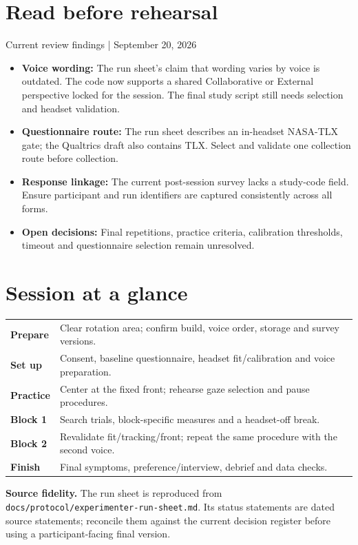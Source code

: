 \documentclass[11pt]{article}
\begin{document}
\section{Read before rehearsal}
\begin{ucfcallout}{Current review findings | September 20, 2026}
\begin{itemize}
\item \textbf{Voice wording:} The run sheet's claim that wording varies by voice is outdated. The code now supports a shared Collaborative or External perspective locked for the session. The final study script still needs selection and headset validation.
\item \textbf{Questionnaire route:} The run sheet describes an in-headset NASA-TLX gate; the Qualtrics draft also contains TLX. Select and validate one collection route before collection.
\item \textbf{Response linkage:} The current post-session survey lacks a study-code field. Ensure participant and run identifiers are captured consistently across all forms.
\item \textbf{Open decisions:} Final repetitions, practice criteria, calibration thresholds, timeout and questionnaire selection remain unresolved.
\end{itemize}
\end{ucfcallout}
\section{Session at a glance}
\begin{tabularx}{\linewidth}{@{}p{0.8in}X@{}}
\textbf{Prepare} & Clear rotation area; confirm build, voice order, storage and survey versions. \\[10pt]
\textbf{Set up} & Consent, baseline questionnaire, headset fit/calibration and voice preparation. \\[10pt]
\textbf{Practice} & Center at the fixed front; rehearse gaze selection and pause procedures. \\[10pt]
\textbf{Block 1} & Search trials, block-specific measures and a headset-off break. \\[10pt]
\textbf{Block 2} & Revalidate fit/tracking/front; repeat the same procedure with the second voice. \\[10pt]
\textbf{Finish} & Final symptoms, preference/interview, debrief and data checks. \\
\end{tabularx}
\vspace{12pt}
\textbf{Source fidelity.} The run sheet is reproduced from \texttt{docs/protocol/experimenter-run-sheet.md}. Its status statements are dated source statements; reconcile them against the current decision register before using a participant-facing final version.
\clearpage

\end{document}
